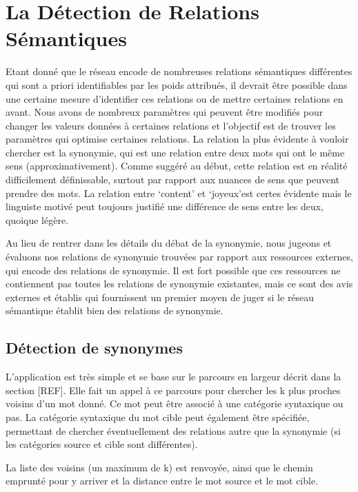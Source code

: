 \section{La Détection de Relations Sémantiques}

Etant donné que le réseau encode de nombreuses relations sémantiques 
différentes qui sont a priori identifiables par les poids attribués, il devrait 
être possible dans une certaine mesure d'identifier ces relations ou de mettre 
certaines relations en avant. Nous avons de nombreux paramètres qui peuvent être 
modifiés pour changer les valeurs données à certaines relations et l'objectif 
est de trouver les paramètres qui optimise certaines relations. La relation la 
plus évidente à vouloir chercher est la synonymie, qui est une relation 
entre deux mots qui ont le même sens (approximativement). Comme suggéré au 
début, cette relation est en réalité difficilement définissable, surtout par 
rapport aux nuances de sens que peuvent prendre des mots. La relation entre 
\lq{content}\rq{} et \lq{joyeux}\rq est certes évidente mais le linguiste motivé 
peut toujours justifié une différence de sens entre les deux, quoique légère.

Au lieu de rentrer dans les détails du débat de la synonymie, nous jugeons et 
évaluons nos relations de synonymie trouvées par rapport aux ressources 
externes, qui encode des relations de synonymie. Il est fort possible que ces 
ressources ne contiennent pas toutes les relations de synonymie existantes, mais 
ce sont des avis externes et établis qui fournissent un premier moyen de juger 
si le réseau sémantique établit bien des relations de synonymie.

\subsection{Détection de synonymes}

L'application est très simple et se base sur le parcours en largeur décrit dans 
la section [REF]. Elle fait un appel à ce parcours pour chercher les k plus 
proches voisins d'un mot donné. Ce mot peut être associé à une catégorie 
syntaxique ou pas. La catégorie syntaxique du mot cible peut également être 
spécifiée, permettant de chercher éventuellement des relations autre que la 
synonymie (si les catégories source et cible sont différentes).

La liste des voisins (un maximum de k) est renvoyée, ainsi que le chemin 
emprunté pour y arriver et la distance entre le mot source et le mot cible.

